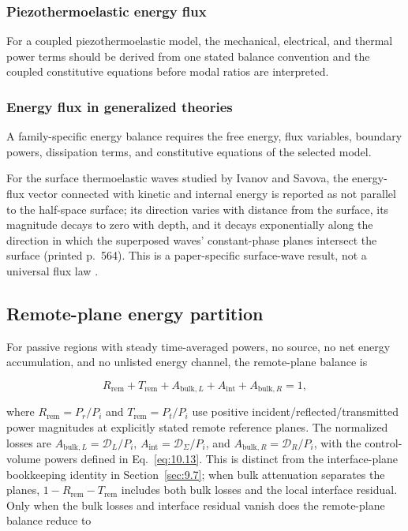 \subsubsection{Piezothermoelastic energy flux}

For a coupled piezothermoelastic model, the mechanical, electrical, and thermal power terms should be derived from one stated balance convention and the coupled constitutive equations before modal ratios are interpreted.

\subsubsection{Energy flux in generalized theories}

A family-specific energy balance requires the free energy, flux variables, boundary powers, dissipation terms, and constitutive equations of the selected model.

For the surface thermoelastic waves studied by Ivanov and Savova, the energy-flux vector connected with kinetic and internal energy is reported as not parallel to the half-space surface; its direction varies with distance from the surface, its magnitude decays to zero with depth, and it decays exponentially along the direction in which the superposed waves' constant-phase planes intersect the surface (printed p.~564). This is a paper-specific surface-wave result, not a universal flux law \cite{IvanovSavova1991}.

\subsection{Remote-plane energy partition}
\label{sec:10.5}

For passive regions with steady time-averaged powers, no source, no net energy accumulation, and no unlisted energy channel, the remote-plane balance is

\begin{equation}
R_{\mathrm{rem}} + T_{\mathrm{rem}} + A_{\mathrm{bulk},L} + A_{\mathrm{int}} + A_{\mathrm{bulk},R} = 1,
\label{eq:10.11}
\end{equation}

where $R_{\mathrm{rem}}=P_r/P_i$ and $T_{\mathrm{rem}}=P_t/P_i$ use positive incident/reflected/transmitted power magnitudes at explicitly stated remote reference planes. The normalized losses are $A_{\mathrm{bulk},L}=\mathcal{D}_L/P_i$, $A_{\mathrm{int}}=\mathcal{D}_{\Sigma}/P_i$, and $A_{\mathrm{bulk},R}=\mathcal{D}_R/P_i$, with the control-volume powers defined in Eq.~\eqref{eq:10.13}. This is distinct from the interface-plane bookkeeping identity in Section~\ref{sec:9.7}; when bulk attenuation separates the planes, $1-R_{\mathrm{rem}}-T_{\mathrm{rem}}$ includes both bulk losses and the local interface residual. Only when the bulk losses and interface residual vanish does the remote-plane balance reduce to

